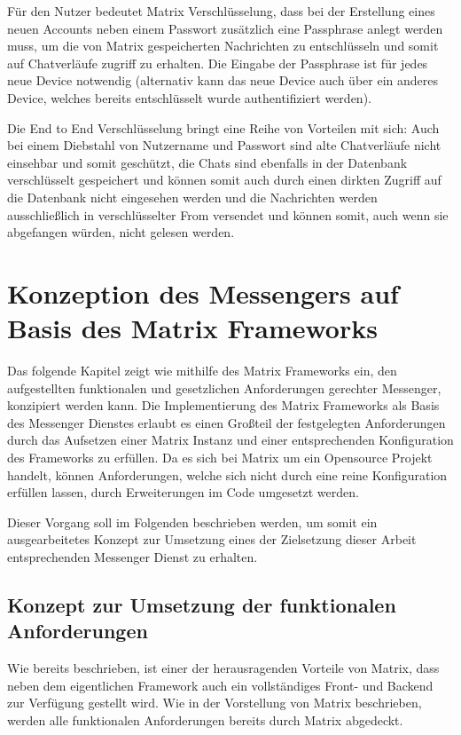Für den Nutzer bedeutet Matrix Verschlüsselung, dass bei der Erstellung eines neuen Accounts neben einem Passwort zusätzlich eine Passphrase anlegt werden muss, um die von Matrix gespeicherten Nachrichten zu entschlüsseln und somit auf Chatverläufe zugriff zu erhalten.
Die Eingabe der Passphrase ist für jedes neue Device notwendig (alternativ kann das neue Device auch über ein anderes Device, welches bereits entschlüsselt wurde authentifiziert werden).

Die End to End Verschlüsselung bringt eine Reihe von Vorteilen mit sich: Auch bei einem Diebstahl von Nutzername und Passwort sind alte Chatverläufe nicht einsehbar und somit geschützt, die Chats sind ebenfalls in der Datenbank verschlüsselt gespeichert und können somit auch durch einen dirkten Zugriff auf die Datenbank nicht eingesehen werden und die Nachrichten werden ausschließlich in verschlüsselter From versendet und können somit, auch wenn sie abgefangen würden, nicht gelesen werden.

\section{Konzeption des Messengers auf Basis des Matrix Frameworks}\label{chapter:km}
Das folgende Kapitel zeigt wie mithilfe des Matrix Frameworks ein, den aufgestellten funktionalen und gesetzlichen Anforderungen gerechter Messenger, konzipiert werden kann.
Die Implementierung des Matrix Frameworks als Basis des Messenger Dienstes erlaubt es einen Großteil der festgelegten Anforderungen durch das Aufsetzen einer Matrix Instanz und einer entsprechenden Konfiguration des Frameworks zu erfüllen. Da es sich bei Matrix um ein Opensource Projekt handelt, können Anforderungen, welche sich nicht durch eine reine Konfiguration erfüllen lassen, durch Erweiterungen im Code umgesetzt werden.

Dieser Vorgang soll im Folgenden beschrieben werden, um somit ein ausgearbeitetes Konzept zur Umsetzung eines der Zielsetzung dieser Arbeit entsprechenden Messenger Dienst zu erhalten.

\subsection{Konzept zur Umsetzung der funktionalen Anforderungen}\label{chapter:am}
Wie bereits beschrieben, ist einer der herausragenden Vorteile von Matrix, dass neben dem eigentlichen Framework auch ein vollständiges Front- und Backend zur Verfügung gestellt wird. Wie in der Vorstellung von Matrix beschrieben, werden alle funktionalen Anforderungen bereits durch Matrix abgedeckt.

